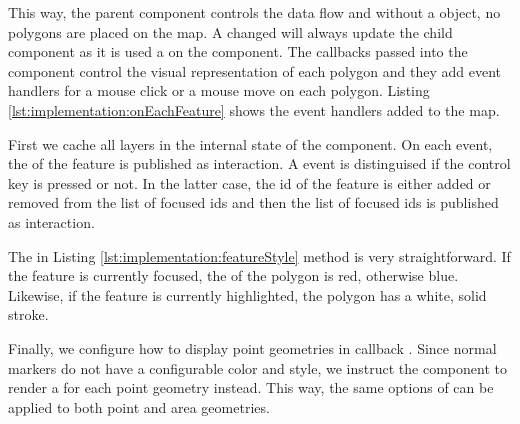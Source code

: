 This way, the parent  component controls the data flow and without a  object, no polygons are placed on the map.
A changed  will always update the child component as it is used a  on the  component.
The callbacks passed into the  component control the visual representation of each polygon and they add event handlers for a mouse click or a mouse move on each polygon.
Listing \ref{lst:implementation:onEachFeature} shows the event handlers added to the map.



First we cache all layers in the internal state of the  component.
On each  event, the  of the feature is published as  interaction.
A  event is distinguised if the control key is pressed or not.
In the latter case, the id of the feature is either added or removed from the list of focused ids and then the list of focused ids is published as  interaction.



The  in Listing \ref{lst:implementation:featureStyle} method is very straightforward.
If the feature is currently focused, the  of the polygon is red, otherwise blue.
Likewise, if the feature is currently highlighted, the polygon has a white, solid stroke.



Finally, we configure how to display point geometries in callback .
Since normal markers do not have a configurable color and style, we instruct the  component to render a  for each point geometry instead.
This way, the same options of  can be applied to both point and area geometries.

